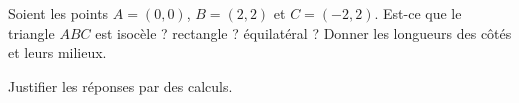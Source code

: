 
\begin{exercice}\label{exoSeconde-0006}

    Soient les points \( A=(0,0)\), \( B=(2,2)\) et \( C=(-2,2)\). Est-ce que le triangle \( ABC\) est isocèle ? rectangle ? équilatéral ? Donner les longueurs des côtés et leurs milieux.

    Justifier les réponses par des calculs.

\end{exercice}

